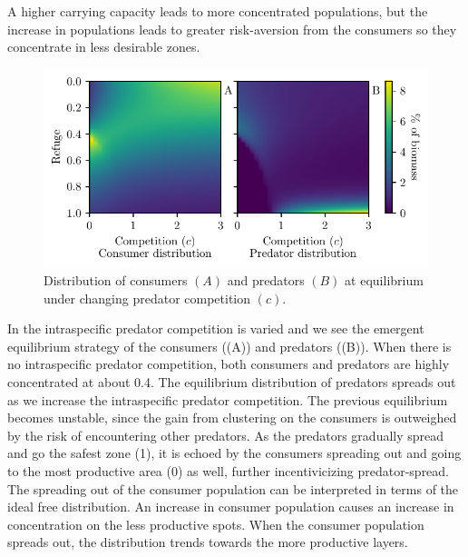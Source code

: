 A higher carrying capacity leads to more concentrated populations, but the increase in populations leads to greater risk-aversion from the consumers so they concentrate in less desirable zones.

\begin{figure}[H]
  \caption{Distribution of consumers $(A)$ and predators $(B)$ at equilibrium under changing predator competition $(c)$.}
  \label{fig:strat_comp}
    \includegraphics{plots/increasing_competition_c.pdf}
\end{figure}
In  the intraspecific predator competition is varied and we see the emergent  equilibrium strategy of the consumers ((A)) and predators ((B)). When there is no intraspecific predator competition, both consumers and predators are highly concentrated at about 0.4. The equilibrium distribution of predators spreads out as we increase the intraspecific predator competition. The previous equilibrium becomes unstable, since the gain from clustering on the consumers is outweighed by the risk of encountering other predators. As the predators gradually spread and go the safest zone (1), it is echoed by the consumers spreading out and going to the most productive area (0) as well, further incentivicizing predator-spread. The spreading out of the consumer population can be interpreted in terms of the ideal free distribution. An increase in consumer population  causes an increase in concentration on the less productive spots. When the consumer population spreads out, the distribution trends towards the more productive layers.

